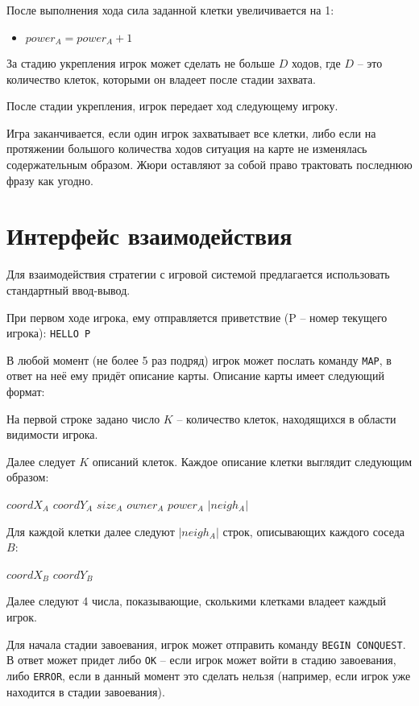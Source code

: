 \documentclass[12pt, a4paper]{article}
\begin{document}
После выполнения хода сила заданной клетки увеличивается на 1:

\begin{itemize}
\item $power_A = power_A + 1$
\end{itemize}

За стадию укрепления игрок может сделать не больше $D$ ходов, где $D$ -- это количество клеток, которыми он владеет после стадии захвата.

После стадии укрепления, игрок передает ход следующему игроку.

Игра заканчивается, если один игрок захватывает все клетки, либо если на протяжении большого количества ходов ситуация на карте не изменялась содержательным образом. Жюри оставляют за собой право трактовать последнюю фразу как угодно.

{\section{Интерфейс взаимодействия}}

Для взаимодействия стратегии с игровой системой предлагается использовать стандартный ввод-вывод.

При первом ходе игрока, ему отправляется приветствие (P -- номер текущего игрока): \texttt{HELLO P}

В любой момент (не более 5 раз подряд) игрок может послать команду \texttt{MAP}, в ответ на неё ему придёт описание карты. Описание карты имеет следующий формат:

На первой строке задано число $K$ -- количество клеток, находящихся в области видимости игрока.

Далее следует $K$ описаний клеток. Каждое описание клетки выглядит следующим образом:

$coordX_A$ $coordY_A$ $size_A$ $owner_A$ $power_A$ $|{neigh_A}|$

Для каждой клетки далее следуют $|{neigh_A}|$ строк, описывающих каждого соседа $B$:

$coordX_B$ $coordY_B$

Далее следуют 4 числа, показывающие, сколькими клетками владеет каждый игрок.

Для начала стадии завоевания, игрок может отправить команду \texttt{BEGIN CONQUEST}. В ответ может придет либо \texttt{OK} -- если игрок может войти в стадию завоевания, либо \texttt{ERROR}, если в данный момент это сделать нельзя (например, если игрок уже находится в стадии завоевания).
\end{document}
